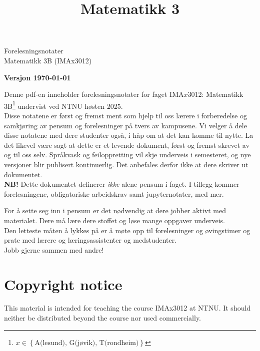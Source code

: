 \documentclass[11pt,parskip=half,x11names, twoside=false, open=any, a4paper]{scrbook}
\title{Matematikk 3}
\author{}
\begin{document}
\begin{titlepage}
    \vspace*{7em}
    \begin{center}
        {\Huge Forelesningsnotater\\[.5em] Matematikk 3B (IMAx3012)}
    \end{center}
\begin{center}
\Large \textbf{ Versjon \today }
\end{center}\vfill

\begin{remF}{}{}
Denne pdf-en inneholder forelesningsnotater for faget IMA$x$3012: Matematikk 3B\footnote{
$x \in \left\{\text{A(lesund), G(jøvik), T(rondheim)}\right\}$} undervist ved NTNU høsten 2025.  \\

Disse notatene er først og fremst ment som hjelp til oss lærere i forberedelse og samkjøring av pensum og forelesninger på tvers av kampusene. Vi velger å dele disse notatene med dere studenter også, i håp om at det kan komme til nytte. La det likevel være sagt at dette er et levende dokument, først og fremst skrevet av og til oss selv. Språkvask og feiloppretting vil skje underveis i semesteret, og nye versjoner blir publisert
kontinuerlig. Det anbefales derfor ikke at dere skriver ut dokumentet.\\

\textbf{ NB!} Dette dokumentet definerer \emph{ ikke } alene pensum i faget. I tillegg kommer forelesningene, obligatoriske arbeidskrav samt jupyternotater, med mer.

\end{remF}
\end{titlepage}
\begin{tcolorbox}[colback=white,colframe=red!40!black,title= Forelesningsnotater og videoer erstatter ikke eget arbeid med fagstoff!]

For å sette seg inn i pensum er det nødvendig at dere jobber aktivt med materialet. Dere må lære dere stoffet
og løse mange oppgaver underveis. \\

Den letteste måten å lykkes på er å møte 
opp til forelesninger og øvingstimer og prate med lærere og læringsassistenter og
medstudenter. \\

Jobb gjerne sammen med andre!
\end{tcolorbox}
    \section*{Copyright notice}
This material is intended for teaching the course IMAx3012 at NTNU. It should neither be distributed beyond the course nor used commercially.
\end{document}
